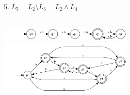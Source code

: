 \documentclass{article}
\begin{document}
\begin{enumerate}
5. $L_5 = L_2 \setminus L_3 = L_2 \wedge L_4 $ \\ \\
\begin{center}
    \includegraphics[width=0.5\textwidth]{g251.png}
    \includegraphics[width=0.5\textwidth]{g252.png}
\end{center}


\end{enumerate}
\end{document}
